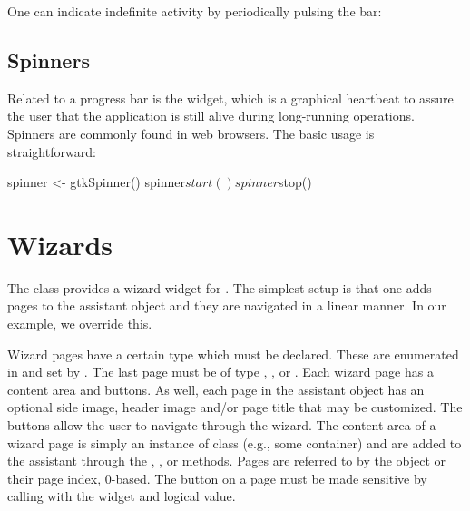 One can indicate indefinite activity by periodically pulsing the bar:
\begin{Schunk}
\end{Schunk}

\subsection{Spinners}

Related to a progress bar is the  widget, which is a
graphical heartbeat to assure the user that the application is still
alive during long-running operations. Spinners are commonly found in
web browsers. The basic usage is straightforward:
\begin{Schunk}
\begin{Sinput}
 spinner <- gtkSpinner()
 spinner$start()
 spinner$stop()
\end{Sinput}
\end{Schunk}


\section{Wizards}
\label{sec:gtk-wizards}

The  class provides a wizard widget for \GTK. The
simplest setup is that one adds pages to the assistant object and they
are navigated in a linear manner. In our example, we override this.

Wizard pages have a certain type which must be declared. These are
enumerated in  and set by
. The last page must be of type
, , or .  Each wizard
page has a content area and buttons.  As well, each page in the
assistant object has an optional side image, header image and/or page
title that may be customized. The buttons allow the user to navigate
through the wizard. The content area of a wizard page is simply an
instance of class  (e.g., some container) and are
added to the assistant through the ,
, or
 methods. Pages are referred to by
the  object or their page index, $0$-based. The
 button on a page must be made sensitive by calling
 with the widget and logical
value.

